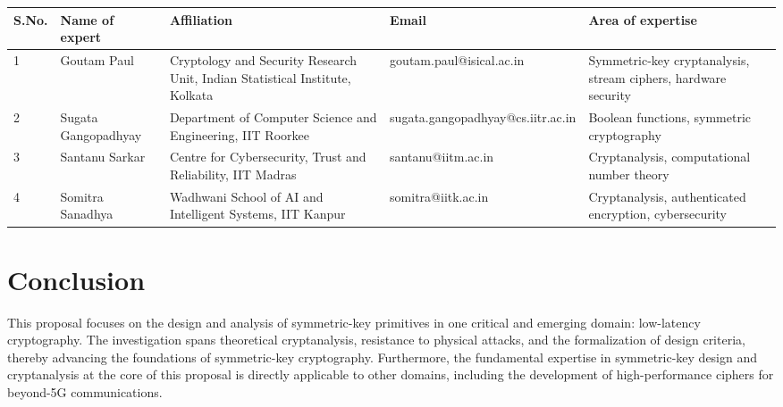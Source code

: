 \begin{table}[htbp]
\centering\footnotesize
\begin{tabular}{@{}p{0.7cm}p{2.7cm}p{4.0cm}p{4.5cm}p{3.3cm}@{}}
\toprule
\textbf{S.No.} & \textbf{Name of expert} & \textbf{Affiliation} & \textbf{Email} & \textbf{Area of expertise} \\
\midrule
1 & Goutam Paul & Cryptology and Security Research Unit, Indian Statistical Institute, Kolkata & goutam.paul@isical.ac.in & Symmetric-key cryptanalysis, stream ciphers, hardware security \\
2 & Sugata Gangopadhyay & Department of Computer Science and Engineering, IIT Roorkee & sugata.gangopadhyay@cs.iitr.ac.in & Boolean functions, symmetric cryptography \\
3 & Santanu Sarkar & Centre for Cybersecurity, Trust and Reliability, IIT Madras & santanu@iitm.ac.in & Cryptanalysis, computational number theory \\
4 & Somitra Sanadhya & Wadhwani School of AI and Intelligent Systems, IIT Kanpur & somitra@iitk.ac.in & Cryptanalysis, authenticated encryption, cybersecurity \\
\bottomrule
\end{tabular}
\end{table}


\section*{Conclusion}

This proposal focuses on the design and analysis of symmetric-key primitives in one critical and emerging domain: low-latency cryptography.
The investigation spans theoretical cryptanalysis, resistance to physical attacks, and the formalization of design criteria, thereby advancing the foundations of symmetric-key cryptography.
Furthermore, the fundamental expertise in symmetric-key design and cryptanalysis at the core of this proposal is directly applicable to other domains, including the development of high-performance ciphers for beyond-5G communications.

\pagebreak



